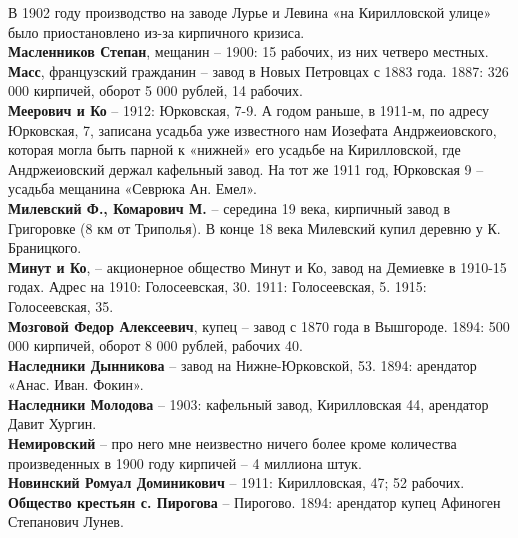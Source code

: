 В 1902 году производство на заводе Лурье и Левина «на Кирилловской улице» было приостановлено из-за кирпичного кризиса.\\

\noindent\textbf{Масленников Степан}, мещанин – 1900: 15 рабочих, из них четверо местных.\\ 

\noindent\textbf{Масс}, французский гражданин – завод в Новых Петровцах с 1883 года. 1887: 326 000 кирпичей, оборот 5 000 рублей, 14 рабочих.\\

\noindent\textbf{Меерович и Ко} – 1912: Юрковская, 7-9. А годом раньше, в 1911-м, по адресу Юрковская, 7, записана усадьба уже известного нам Иозефата Андржеиовского, которая могла быть парной к «нижней» его усадьбе на Кирилловской, где Андржеиовский держал кафельный завод. На тот же 1911 год, Юрковская 9 – усадьба мещанина «Севрюка Ан. Емел».\\

\noindent\textbf{Милевский Ф., Комарович М.} – середина 19 века, кирпичный завод в Григоровке (8 км от Триполья). В конце 18 века Милевский купил деревню у К. Браницкого.\\

\noindent\textbf{Минут и Ко}, – акционерное общество Минут и Ко, завод на Демиевке в 1910-15 годах. Адрес на 1910: Голосеевская, 30. 1911: Голосеевская, 5. 1915: Голосеевская, 35.\\

\noindent\textbf{Мозговой Федор Алексеевич}, купец – завод с 1870 года в Вышгороде. 1894: 500 000 кирпичей, оборот 8 000 рублей, рабочих 40.\\

\noindent\textbf{Наследники Дынникова} – завод на Нижне-Юрковской, 53. 1894: арендатор «Анас. Иван. Фокин».\\

\noindent\textbf{Наследники Молодова} – 1903: кафельный завод, Кирилловская 44, арендатор Давит Хургин.\\

\noindent\textbf{Немировский} – про него мне неизвестно ничего более кроме количества произведенных в 1900 году кирпичей – 4 миллиона штук.\\

\noindent\textbf{Новинский Ромуал Доминикович} – 1911: Кирилловская, 47; 52 рабочих.\\

\noindent\textbf{Общество крестьян с. Пирогова} – Пирогово. 1894: арендатор купец Афиноген Степанович Лунев.\\

